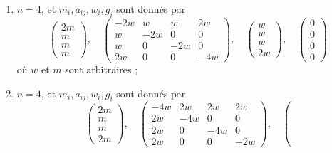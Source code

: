 \begin{lemma}[Genre un]
\begin{enumerate}
$$\right),
\quad
\left(
\begin{matrix}
2w \\
w \\
w \\
2w
\end{matrix}
\right),
\quad
\left(
\begin{matrix}
0 \\
0 \\
0 \\
0
\end{matrix}
\right)
$$
où $w$ et $m$ sont arbitraires ;
\item
\label{item-triple-with-up}
$n = 4$, et $m_i, a_{ij}, w_i, g_i$ sont donnés par
$$
\left(
\begin{matrix}
2m \\
m \\
m \\
m
\end{matrix}
\right),
\quad
\left(
\begin{matrix}
-2w & w & w & 2w \\
w & -2w & 0 & 0 \\
w & 0 & -2w & 0 \\
2w & 0 & 0 & -4w
\end{matrix}
\right),
\quad
\left(
\begin{matrix}
w \\
w \\
w \\
2w
\end{matrix}
\right),
\quad
\left(
\begin{matrix}
0 \\
0 \\
0 \\
0
\end{matrix}
\right)
$$
où $w$ et $m$ sont arbitraires ;
\item
\label{item-triple-with-down}
$n = 4$, et $m_i, a_{ij}, w_i, g_i$ sont donnés par
$$
\left(
\begin{matrix}
2m \\
m \\
m \\
2m
\end{matrix}
\right),
\quad
\left(
\begin{matrix}
-4w & 2w & 2w & 2w \\
2w & -4w & 0 & 0 \\
2w & 0 & -4w & 0 \\
2w & 0 & 0 & -2w
\end{matrix}
\right),
\quad
\left(
$$
\end{enumerate}
\end{lemma}
